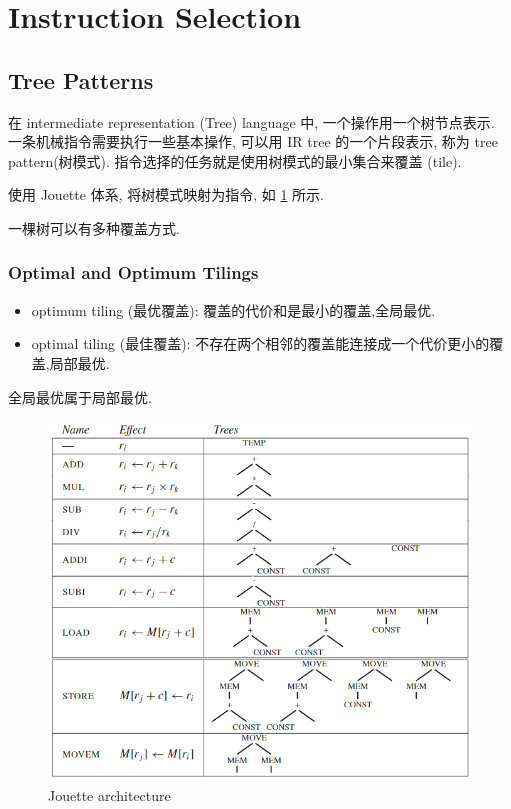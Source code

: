 \section{Instruction Selection}

\subsection{Tree Patterns}
在 intermediate representation (Tree) language 中, 一个操作用一个树节点表示. 一条机械指令需要执行一些基本操作, 可以用 IR tree 的一个片段表示, 称为 tree pattern(树模式). 指令选择的任务就是使用树模式的最小集合来覆盖 (tile).

使用 Jouette 体系, 将树模式映射为指令, 如 \ref{fig:Jouette} 所示.

一棵树可以有多种覆盖方式. 

\subsubsection{Optimal and Optimum Tilings}
\begin{itemize}
    \item optimum tiling (最优覆盖): 覆盖的代价和是最小的覆盖,全局最优.
    \item optimal tiling (最佳覆盖): 不存在两个相邻的覆盖能连接成一个代价更小的覆盖,局部最优.
\end{itemize}
全局最优属于局部最优.

\begin{figure}[H]
    \centering
    \includegraphics[width=0.98\linewidth]{pic/CP9/Jouette architecture}
    \caption{Jouette architecture}
    \label{fig:Jouette}
\end{figure}

